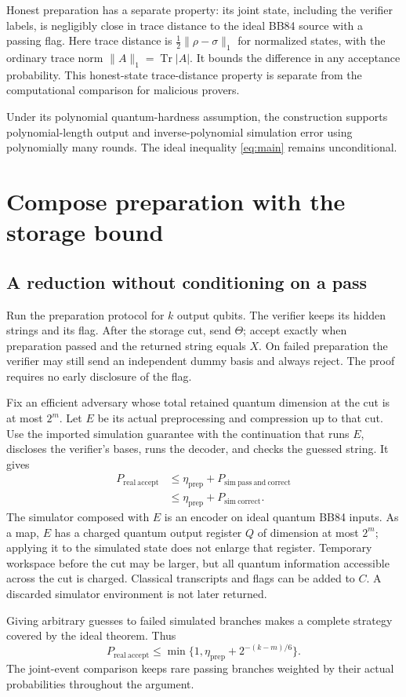 \documentclass[11pt,a4paper]{article}
\newcommand{\Tr}{\operatorname{Tr}}
\newcommand{\newsection}[1]{\section{#1}}
\begin{document}
Honest preparation has a separate property: its joint state, including the verifier labels, is negligibly close in trace distance to the ideal BB84 source with a passing flag. Here trace distance is $\tfrac12\lVert\rho-\sigma\rVert_1$ for normalized states, with the ordinary trace norm $\lVert A\rVert_1=\Tr|A|$. It bounds the difference in any acceptance probability. This honest-state trace-distance property is separate from the computational comparison for malicious provers.

Under its polynomial quantum-hardness assumption, the construction supports polynomial-length output and inverse-polynomial simulation error using polynomially many rounds. The ideal inequality \eqref{eq:main} remains unconditional.

\newsection{Compose preparation with the storage bound}
\subsection{A reduction without conditioning on a pass}
Run the preparation protocol for $k$ output qubits. The verifier keeps its hidden strings and its flag. After the storage cut, send $\Theta$; accept exactly when preparation passed and the returned string equals $X$. On failed preparation the verifier may still send an independent dummy basis and always reject. The proof requires no early disclosure of the flag.

Fix an efficient adversary whose total retained quantum dimension at the cut is at most $2^m$. Let $E$ be its actual preprocessing and compression up to that cut. Use the imported simulation guarantee with the continuation that runs $E$, discloses the verifier's bases, runs the decoder, and checks the guessed string. It gives
\begin{align*}
P_{\mathrm{real\ accept}}
&\leq\eta_{\mathrm{prep}}
+P_{\mathrm{sim\ pass\ and\ correct}}\\
&\leq\eta_{\mathrm{prep}}+P_{\mathrm{sim\ correct}}.
\end{align*}
The simulator composed with $E$ is an encoder on ideal quantum BB84 inputs. As a map, $E$ has a charged quantum output register $Q$ of dimension at most $2^m$; applying it to the simulated state does not enlarge that register. Temporary workspace before the cut may be larger, but all quantum information accessible across the cut is charged. Classical transcripts and flags can be added to $C$. A discarded simulator environment is not later returned.

Giving arbitrary guesses to failed simulated branches makes a complete strategy covered by the ideal theorem. Thus
\[
P_{\mathrm{real\ accept}}\leq\min\{1,\eta_{\mathrm{prep}}+2^{-(k-m)/6}\}.
\]
The joint-event comparison keeps rare passing branches weighted by their actual probabilities throughout the argument.
\end{document}
